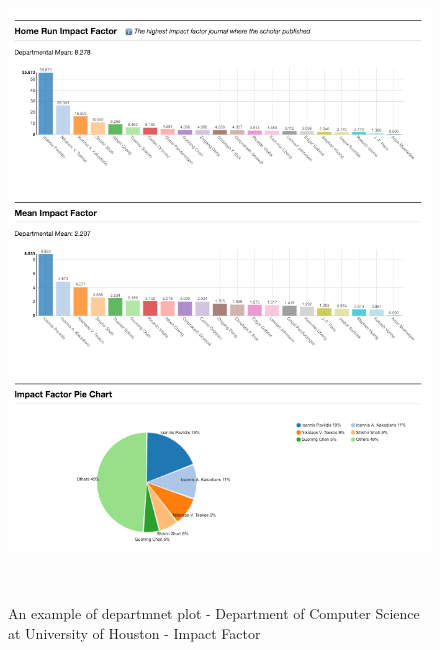 \begin{figure}
  \centering
  \includegraphics[width=1\textwidth]{figures/Dept-IF}
  \caption{An example of departmnet plot - Department of Computer Science at University of Houston - Impact Factor}~\label{fig:DP-College1}
\end{figure}

